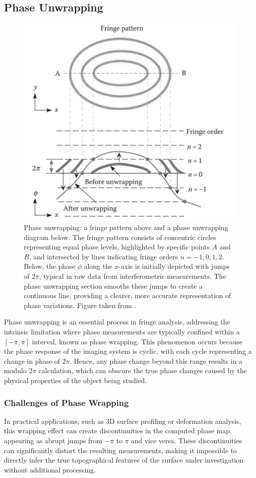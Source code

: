 \documentclass[../main.tex]{subfiles}
\begin{document}
\subsection{Phase Unwrapping}
\vspace{-8pt}
\begin{figure}
    \vspace{-5.5cm}
    \includegraphics[height=0.4\textwidth]{Images/Introduction/phase_unwrapping}
    \vspace{-8pt}
    \caption{Phase unwrapping: a fringe pattern above and a phase unwrapping diagram below. The fringe pattern consists of concentric circles representing equal phase levels, highlighted by specific points \(A\) and \(B\), and intersected by lines indicating fringe orders \(n = -1, 0, 1, 2\). Below, the phase \(\phi\) along the \(x\)-axis is initially depicted with jumps of \(2\pi\), typical in raw data from interferometric measurements. The phase unwrapping section smooths these jumps to create a continuous line, providing a clearer, more accurate representation of phase variations. Figure taken from \cite{fringe_analysis}.}
    \label{fig:phase_wrapping}
\end{figure}
\begin{minipage}{0.5\textwidth}
Phase unwrapping is an essential process in fringe analysis, addressing the intrinsic limitation where phase measurements are typically confined within a $[-\pi, \pi]$ interval, known as phase wrapping. This phenomenon occurs because the phase response of the imaging system is cyclic, with each cycle representing a change in phase of $2\pi$. Hence, any phase change beyond this range results in a modulo $2\pi$ calculation, which can obscure the true phase changes caused by the physical properties of the object being studied.
\vspace{-10pt}
\subsubsection{Challenges of Phase Wrapping}
\vspace{-4pt}
In practical applications, such as 3D surface profiling or deformation analysis, this wrapping effect can create discontinuities in the computed phase map, appearing as abrupt jumps from $-\pi$ to $\pi$ and vice versa. These discontinuities can significantly distort the resulting measurements, making it impossible to directly infer the true topographical features of the surface under investigation without additional processing.
\end{minipage}
\end{document}
